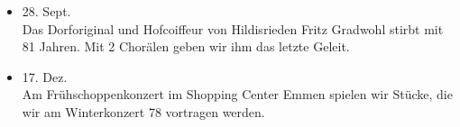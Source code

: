 \begin{history}
\begin{itemize}
        \item 28. Sept.\\
              Das Dorforiginal und Hofcoiffeur von Hildisrieden Fritz Gradwohl stirbt
              mit 81 Jahren. Mit 2 Chorälen geben wir ihm das letzte Geleit.

        \item 17. Dez.\\
              Am Frühschoppenkonzert im Shopping Center Emmen spielen wir Stücke, die
              wir am Winterkonzert 78 vortragen werden.

    \end{itemize}

\end{history}
